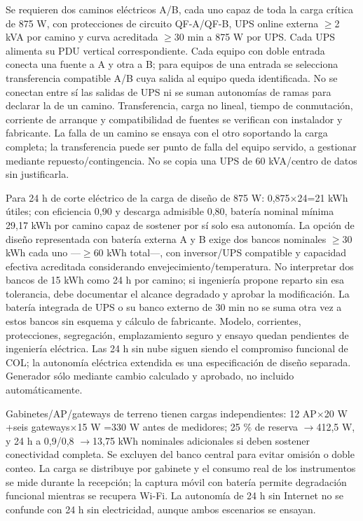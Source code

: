 \documentclass[11pt,letterpaper]{report}
\begin{document}
Se requieren dos caminos eléctricos A/B, cada uno capaz de toda la carga crítica de 875 W, con protecciones de circuito QF-A/QF-B, UPS online externa $\geq$2 kVA por camino y curva acreditada $\geq$30 min a 875 W por UPS. Cada UPS alimenta su PDU vertical correspondiente. Cada equipo con doble entrada conecta una fuente a A y otra a B; para equipos de una entrada se selecciona transferencia compatible A/B cuya salida al equipo queda identificada. No se conectan entre sí las salidas de UPS ni se suman autonomías de ramas para declarar la de un camino. Transferencia, carga no lineal, tiempo de conmutación, corriente de arranque y compatibilidad de fuentes se verifican con instalador y fabricante. La falla de un camino se ensaya con el otro soportando la carga completa; la transferencia puede ser punto de falla del equipo servido, a gestionar mediante repuesto/contingencia. No se copia una UPS de 60 kVA/centro de datos sin justificarla.

Para 24 h de corte eléctrico de la carga de diseño de 875 W: 0,875$\times$24=21 kWh útiles; con eficiencia 0,90 y descarga admisible 0,80, batería nominal mínima 29,17 kWh por camino capaz de sostener por sí solo esa autonomía. La opción de diseño representada con batería externa A y B exige dos bancos nominales $\geq$30 kWh cada uno ---$\geq$60 kWh total---, con inversor/UPS compatible y capacidad efectiva acreditada considerando envejecimiento/temperatura. No interpretar dos bancos de 15 kWh como 24 h por camino; si ingeniería propone reparto sin esa tolerancia, debe documentar el alcance degradado y aprobar la modificación. La batería integrada de UPS o su banco externo de 30 min no se suma otra vez a estos bancos sin esquema y cálculo de fabricante. Modelo, corrientes, protecciones, segregación, emplazamiento seguro y ensayo quedan pendientes de ingeniería eléctrica. Las 24 h sin nube siguen siendo el compromiso funcional de COL; la autonomía eléctrica extendida es una especificación de diseño separada. Generador sólo mediante cambio calculado y aprobado, no incluido automáticamente.

Gabinetes/AP/gateways de terreno tienen cargas independientes: 12 AP$\times$20 W +seis gateways$\times$15 W =330 W antes de medidores; 25 \% de reserva $\rightarrow$412,5 W, y 24 h a 0,9/0,8 $\rightarrow$13,75 kWh nominales adicionales si deben sostener conectividad completa. Se excluyen del banco central para evitar omisión o doble conteo. La carga se distribuye por gabinete y el consumo real de los instrumentos se mide durante la recepción; la captura móvil con batería permite degradación funcional mientras se recupera Wi-Fi. La autonomía de 24 h sin Internet no se confunde con 24 h sin electricidad, aunque ambos escenarios se ensayan.
\end{document}
